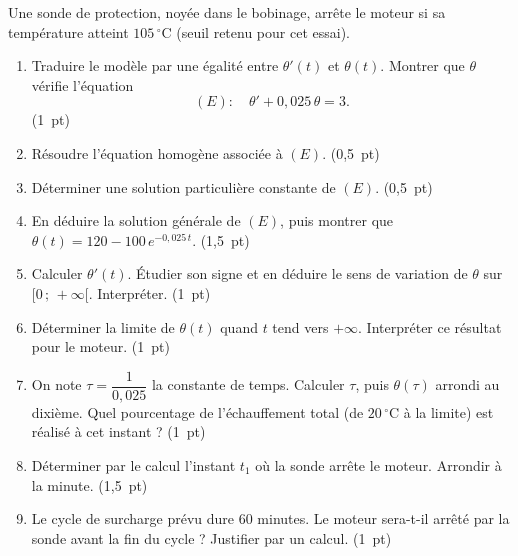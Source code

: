 \documentclass[a4paper,11pt]{article}
\newcommand{\rep}[1]{\par\noindent\begin{minipage}[t][#1cm]{\linewidth}\mbox{}\end{minipage}\par}
\newcommand{\pts}[1]{\unskip\nobreak\hfill\mbox{\small\color{uimmgray}(#1)}}
\begin{document}
Une sonde de protection, noyée dans le bobinage, arrête le moteur si sa température atteint $105\,^\circ$C (seuil retenu pour cet essai).

\begin{enumerate}
  \needspace{4.6cm}
  \item Traduire le modèle par une égalité entre $\theta'(t)$ et $\theta(t)$. Montrer que $\theta$ vérifie l'équation \[ (E) : \quad \theta' + 0{,}025\,\theta = 3 . \] \pts{1 pt}
  \rep{3.0}
  \needspace{3.1cm}
  \item Résoudre l'équation homogène associée à $(E)$. \pts{0,5 pt}
  \rep{1.5}
  \needspace{3.1cm}
  \item Déterminer une solution particulière constante de $(E)$. \pts{0,5 pt}
  \rep{1.5}
  \needspace{5.6cm}
  \item En déduire la solution générale de $(E)$, puis montrer que $\theta(t) = 120 - 100\,e^{-0{,}025\,t}$. \pts{1,5 pt}
  \rep{4.0}
  \needspace{4.6cm}
  \item Calculer $\theta'(t)$. Étudier son signe et en déduire le sens de variation de $\theta$ sur $[0\,;\,+\infty[$. Interpréter. \pts{1 pt}
  \rep{3.0}
  \needspace{3.6cm}
  \item Déterminer la limite de $\theta(t)$ quand $t$ tend vers $+\infty$. Interpréter ce résultat pour le moteur. \pts{1 pt}
  \rep{2.0}
  \needspace{4.6cm}
  \item On note $\tau = \dfrac{1}{0{,}025}$ la constante de temps. Calculer $\tau$, puis $\theta(\tau)$ arrondi au dixième. Quel pourcentage de l'échauffement total (de $20\,^\circ$C à la limite) est réalisé à cet instant ? \pts{1 pt}
  \rep{3.0}
  \needspace{5.6cm}
  \item Déterminer par le calcul l'instant $t_1$ où la sonde arrête le moteur. Arrondir à la minute. \pts{1,5 pt}
  \rep{4.0}
  \needspace{4.6cm}
  \item Le cycle de surcharge prévu dure $60$ minutes. Le moteur sera-t-il arrêté par la sonde avant la fin du cycle ? Justifier par un calcul. \pts{1 pt}
  \rep{3.0}
\end{enumerate}
\end{document}
